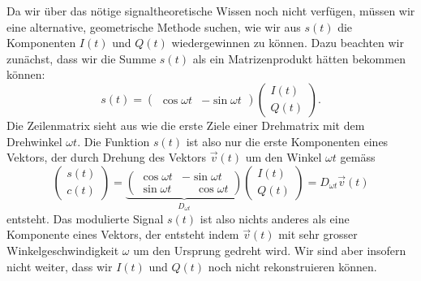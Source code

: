 Da wir über das nötige signaltheoretische Wissen noch nicht verfügen,
müssen wir eine alternative, geometrische Methode suchen, wie wir
aus $s(t)$ die Komponenten $I(t)$ und $Q(t)$ wiedergewinnen zu können.
Dazu beachten wir zunächst, dass wir die Summe $s(t)$ als ein
Matrizenprodukt hätten bekommen können:
\[
s(t)
=
\begin{pmatrix}\cos\omega t&-\sin\omega t\end{pmatrix}
\begin{pmatrix}I(t)\\Q(t)\end{pmatrix}.
\]
Die Zeilenmatrix sieht aus wie die erste Ziele einer Drehmatrix
mit dem Drehwinkel $\omega t$.
Die Funktion $s(t)$ ist also nur die erste Komponenten eines
Vektors, der durch Drehung des Vektors $\vec{v}(t)$ um den
Winkel $\omega t$ gemäss
\begin{equation}
\begin{pmatrix} s(t)\\ c(t) \end{pmatrix}
=
\underbrace{
\begin{pmatrix}
\cos\omega t & -\sin\omega t\\
\sin\omega t & \phantom{-}\cos\omega t
\end{pmatrix}}_{\displaystyle D_{\omega t}}
\begin{pmatrix}I(t)\\Q(t)\end{pmatrix}
=
D_{\omega t} \vec{v}(t)
\label{eqn:qam:modulation}
\end{equation}
entsteht.
Das modulierte Signal $s(t)$ ist also nichts anderes als eine
Komponente eines Vektors, der entsteht indem $\vec{v}(t)$ mit sehr grosser
Winkelgeschwindigkeit $\omega$ um den Ursprung gedreht wird.
Wir sind aber insofern nicht weiter, dass wir $I(t)$ und $Q(t)$ noch nicht
rekonstruieren können.



